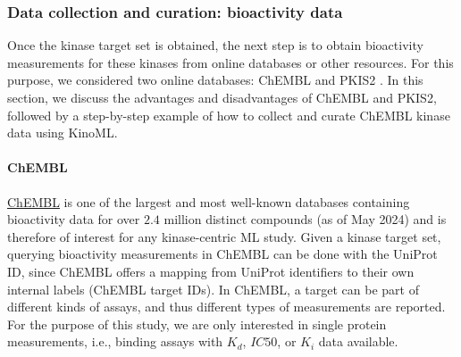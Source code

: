 \documentclass[9pt,lessons, pubversion]{livecoms}
\begin{document}
\subsubsection{Data collection and curation: bioactivity data}

Once the kinase target set is obtained, the next step is to obtain bioactivity measurements for these kinases from online databases or other resources. 
For this purpose, we considered two online databases: ChEMBL \cite{zdrazil2024chembl} and PKIS2 \cite{drewry2017progress}. 
In this section, we discuss the advantages and disadvantages of ChEMBL and PKIS2, followed by a step-by-step example of how to collect and curate ChEMBL kinase data using KinoML.


\paragraph{ChEMBL}
\href{https://www.ebi.ac.uk/chembl/}{ChEMBL} \cite{zdrazil2024chembl} is one of the largest and most well-known databases containing bioactivity data for over $2.4$ million distinct compounds (as of May 2024) and is therefore of interest for any kinase-centric ML study. Given a kinase target set, querying bioactivity measurements in ChEMBL can be done with the UniProt ID, since ChEMBL offers a mapping from UniProt identifiers to their own internal labels (ChEMBL target IDs). 
In ChEMBL, a target can be part of different kinds of assays, and thus different types of measurements are reported.
For the purpose of this study, we are only interested in single protein measurements, i.e., binding assays with $K_d$, $IC50$, or $K_i$ data available.
\end{document}
